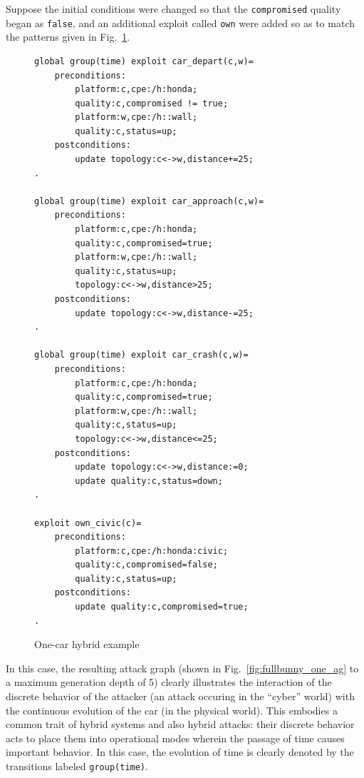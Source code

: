 Suppose the initial conditions were changed so that the \texttt{compromised}
quality began as \texttt{false}, and an additional exploit called \texttt{own}
were added so as to match the patterns given in Fig.~\ref{fig:fullbunny_one_xp}.

\begin{figure}
\begin{lstlisting}
global group(time) exploit car_depart(c,w)=
    preconditions:
        platform:c,cpe:/h:honda;
        quality:c,compromised != true;
        platform:w,cpe:/h::wall;
        quality:c,status=up;
    postconditions:
        update topology:c<->w,distance+=25;
.

global group(time) exploit car_approach(c,w)=
    preconditions:
        platform:c,cpe:/h:honda;
        quality:c,compromised=true;
        platform:w,cpe:/h::wall;
        quality:c,status=up;
        topology:c<->w,distance>25;
    postconditions:
        update topology:c<->w,distance-=25;
.

global group(time) exploit car_crash(c,w)=
    preconditions:
        platform:c,cpe:/h:honda;
        quality:c,compromised=true;
        platform:w,cpe:/h::wall;
        quality:c,status=up;
        topology:c<->w,distance<=25;
    postconditions:
        update topology:c<->w,distance:=0;
        update quality:c,status=down;
.

exploit own_civic(c)=
    preconditions:
        platform:c,cpe:/h:honda:civic;
        quality:c,compromised=false;
        quality:c,status=up;
    postconditions:
        update quality:c,compromised=true;
.
\end{lstlisting}
\caption{One-car hybrid example}
\label{fig:fullbunny_one_xp}
\end{figure}

In this case, the resulting attack graph (shown in 
Fig.~\ref{fig:fullbunny_one_ag} to a maximum generation depth of 5) clearly
illustrates the interaction of the discrete behavior of the attacker (an
attack occuring in the ``cyber'' world) with the continuous evolution of the
car (in the physical world). This embodies a common trait of hybrid systems
and also hybrid attacks: their discrete behavior acts to place them into
operational modes wherein the passage of time causes important behavior. In
this case, the evolution of time is clearly denoted by the transitions labeled
\texttt{group(time)}.


